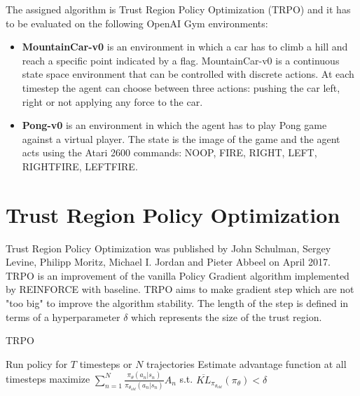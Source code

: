 \documentclass[12pt,a4paper]{article}
\begin{document}
The assigned algorithm is Trust Region Policy Optimization (TRPO) and it has to be evaluated on the following OpenAI Gym environments:
\begin{itemize}
    \item \textbf{MountainCar-v0} is an environment in which a car has to climb a hill and reach a specific point indicated by a flag. MountainCar-v0 is a continuous state space environment that can be controlled with discrete actions. At each timestep the agent can choose between three actions: pushing the car left, right or not applying any force to the car.
    \item \textbf{Pong-v0} is an environment in which the agent has to play Pong game against a virtual player. The state is the image of the game and the agent acts using the Atari 2600 commands: NOOP, FIRE, RIGHT, LEFT, RIGHTFIRE, LEFTFIRE.
\end{itemize}

\section{Trust Region Policy Optimization}

Trust Region Policy Optimization was published by John Schulman, Sergey Levine, Philipp Moritz, Michael I. Jordan and Pieter Abbeel on April 2017. 
TRPO is an improvement of the vanilla Policy Gradient algorithm implemented by REINFORCE with baseline. TRPO aims to make gradient step which are not "too big" to improve the algorithm stability. The length of the step is defined in terms of a hyperparameter $\delta$ which represents the size of the trust region.

\begin{algorithm}[H]
    \caption{TRPO}
\begin{algorithmic}[1]
    \STATE Run policy for $T$ timesteps or $N$ trajectories
    \STATE Estimate advantage function at all timesteps
        \STATE maximize $\sum_{n=1}^N \frac{\pi_\theta(a_n|s_n)}{\pi_{\theta_{old}}(a_n|s_n)} A_n$
        \STATE s.t. $\overline{KL}_{\pi_{\theta_{old}}}(\pi_\theta) < \delta$
    \ENDFOR
\ENDFOR
\end{algorithmic}
\label{alg:TRPO}
\end{algorithm}
\end{document}
